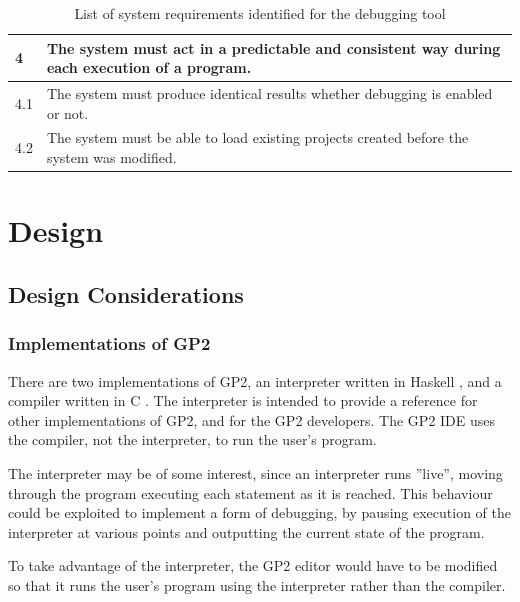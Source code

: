 \documentclass[authoryearcitations]{UoYCSproject}
\begin{document}
\begin{table}[tbp]
\begin{tabularx}{\linewidth}{|l|X|}
        4    &  The system must act in a predictable and consistent way during
                each execution of a program. \\ \hline
        4.1  &  The system must produce identical results whether debugging is
                enabled or not. \\ \hline
        4.2  &  The system must be able to load existing projects created before
                the system was modified. \\ \hline
    \end{tabularx}
    \caption{List of system requirements identified for the debugging tool}
    \label{tab:SystemRequirements}
\end{table}

\clearpage


\chapter{Design}
\label{cha:Design}

\section{Design Considerations}

\subsection{Implementations of GP2}
\label{sec:ImplementationsOfGP2}

There are two implementations of GP2, an interpreter written in Haskell
\citep{bak2015,GP2Interpreter}, and a compiler written in C
\citep{bak2015,GP2Compiler}. The interpreter is intended to provide a
reference for other implementations of GP2, and for the GP2 developers. The
GP2 IDE uses the compiler, not the interpreter, to run the user's program.

The interpreter may be of some interest, since an interpreter runs ''live'',
moving through the program executing each statement as it is reached. This
behaviour could be exploited to implement a form of debugging, by pausing
execution of the interpreter at various points and outputting the current state
of the program.

To take advantage of the interpreter, the GP2 editor would have to be modified
so that it runs the user's program using the interpreter rather than the compiler.
\end{document}
